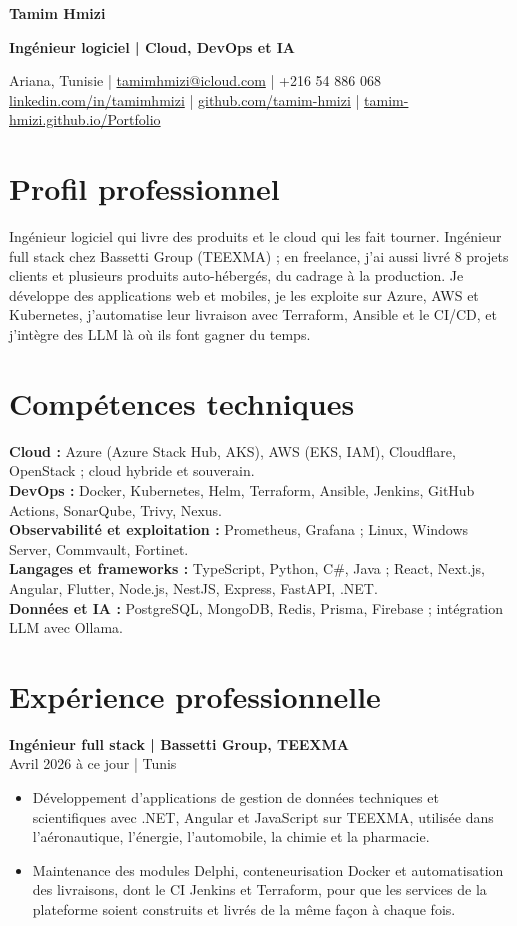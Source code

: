 \documentclass[11pt,a4paper]{article}
\newcommand{\role}[3]{\Needspace{5\baselineskip}\textbf{#1 | #2}\\#3\par}
\begin{document}
{\fontsize{25}{28}\selectfont\textbf{\color{accent}Tamim Hmizi}}\par
{\large\textbf{Ingénieur logiciel | Cloud, DevOps et IA}}\par
Ariana, Tunisie | \href{mailto:tamimhmizi@icloud.com}{tamimhmizi@icloud.com} | +216 54 886 068\\
\href{https://www.linkedin.com/in/tamimhmizi/}{linkedin.com/in/tamimhmizi} | \href{https://github.com/tamim-hmizi}{github.com/tamim-hmizi} | \href{https://tamim-hmizi.github.io/Portfolio/}{tamim-hmizi.github.io/Portfolio}

\section{Profil professionnel}
Ingénieur logiciel qui livre des produits et le cloud qui les fait tourner. Ingénieur full stack chez Bassetti Group (TEEXMA) ; en freelance, j'ai aussi livré 8 projets clients et plusieurs produits auto-hébergés, du cadrage à la production. Je développe des applications web et mobiles, je les exploite sur Azure, AWS et Kubernetes, j'automatise leur livraison avec Terraform, Ansible et le CI/CD, et j'intègre des LLM là où ils font gagner du temps.

\section{Compétences techniques}
\textbf{Cloud :} Azure (Azure Stack Hub, AKS), AWS (EKS, IAM), Cloudflare, OpenStack ; cloud hybride et souverain.\\
\textbf{DevOps :} Docker, Kubernetes, Helm, Terraform, Ansible, Jenkins, GitHub Actions, SonarQube, Trivy, Nexus.\\
\textbf{Observabilité et exploitation :} Prometheus, Grafana ; Linux, Windows Server, Commvault, Fortinet.\\
\textbf{Langages et frameworks :} TypeScript, Python, C\#, Java ; React, Next.js, Angular, Flutter, Node.js, NestJS, Express, FastAPI, .NET.\\
\textbf{Données et IA :} PostgreSQL, MongoDB, Redis, Prisma, Firebase ; intégration LLM avec Ollama.

\section{Expérience professionnelle}
\role{Ingénieur full stack}{Bassetti Group, TEEXMA}{Avril 2026 à ce jour | Tunis}
\begin{itemize}
\item Développement d'applications de gestion de données techniques et scientifiques avec .NET, Angular et JavaScript sur TEEXMA, utilisée dans l'aéronautique, l'énergie, l'automobile, la chimie et la pharmacie.
\item Maintenance des modules Delphi, conteneurisation Docker et automatisation des livraisons, dont le CI Jenkins et Terraform, pour que les services de la plateforme soient construits et livrés de la même façon à chaque fois.
\end{itemize}
\end{document}
